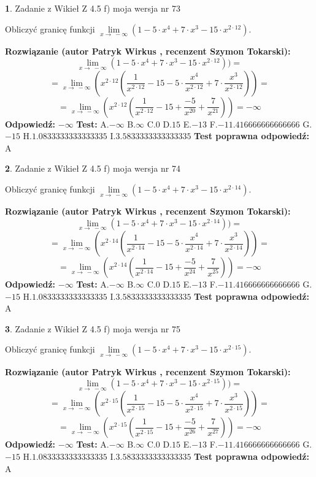 \documentclass[12pt, a4paper]{article}
\theoremstyle{definition} %
\newtheorem{zad}{}
\newcommand{\zadStart}[1]{\begin{zad}#1\newline}
\newcommand{\zadStop}{\end{zad}}
\newcommand{\rozwStart}[2]{\noindent \textbf{Rozwiązanie (autor #1 , recenzent #2): }\newline}
\newcommand{\rozwStop}{\newline}
\newcommand{\odpStart}{\noindent \textbf{Odpowiedź:}\newline}
\newcommand{\odpStop}{\newline}
\newcommand{\testStart}{\noindent \textbf{Test:}\newline}
\newcommand{\testStop}{\newline}
\newcommand{\kluczStart}{\noindent \textbf{Test poprawna odpowiedź:}\newline}
\newcommand{\kluczStop}{\newline}
\begin{document}
\zadStart{Zadanie z Wikieł Z 4.5 f) moja wersja nr 73}


Obliczyć granicę funkcji  $\lim\limits_{x\to\ -\infty}(1 - 5 \cdot x^{4}+7 \cdot x^{3}- 15 \cdot x^{2\cdot12})$.
\zadStop
\rozwStart{Patryk Wirkus}{Szymon Tokarski}
$$\lim\limits_{x\to\ -\infty}(1 - 5 \cdot x^{4}+7 \cdot x^{3}- 15 \cdot x^{2\cdot12}))=$$
$$=\lim\limits_{x\to\ -\infty}(x^{2\cdot12}(\frac{1}{x^{2\cdot12}}-15 -5 \cdot \frac{x^{4}}{x^{2\cdot12}}+7 \cdot \frac{x^{3}}{x^{2\cdot12}}))=$$
$$=\lim\limits_{x\to\ -\infty}(x^{2\cdot12}(\frac{1}{x^{2\cdot12}}-15 + \frac{-5}{x^{20}}+ \frac{7}{x^{21}}))=-\infty$$
\rozwStop
\odpStart
$-\infty$
\odpStop
\testStart
A.$-\infty$ B.$\infty$ C.$0$ D.$15$ E.$-13$
F.$-11.416666666666666$ G.$-15$
H.$1.0833333333333335$
I.$3.5833333333333335$
\testStop
\kluczStart
A
\kluczStop



\zadStart{Zadanie z Wikieł Z 4.5 f) moja wersja nr 74}


Obliczyć granicę funkcji  $\lim\limits_{x\to\ -\infty}(1 - 5 \cdot x^{4}+7 \cdot x^{3}- 15 \cdot x^{2\cdot14})$.
\zadStop
\rozwStart{Patryk Wirkus}{Szymon Tokarski}
$$\lim\limits_{x\to\ -\infty}(1 - 5 \cdot x^{4}+7 \cdot x^{3}- 15 \cdot x^{2\cdot14}))=$$
$$=\lim\limits_{x\to\ -\infty}(x^{2\cdot14}(\frac{1}{x^{2\cdot14}}-15 -5 \cdot \frac{x^{4}}{x^{2\cdot14}}+7 \cdot \frac{x^{3}}{x^{2\cdot14}}))=$$
$$=\lim\limits_{x\to\ -\infty}(x^{2\cdot14}(\frac{1}{x^{2\cdot14}}-15 + \frac{-5}{x^{24}}+ \frac{7}{x^{25}}))=-\infty$$
\rozwStop
\odpStart
$-\infty$
\odpStop
\testStart
A.$-\infty$ B.$\infty$ C.$0$ D.$15$ E.$-13$
F.$-11.416666666666666$ G.$-15$
H.$1.0833333333333335$
I.$3.5833333333333335$
\testStop
\kluczStart
A
\kluczStop



\zadStart{Zadanie z Wikieł Z 4.5 f) moja wersja nr 75}


Obliczyć granicę funkcji  $\lim\limits_{x\to\ -\infty}(1 - 5 \cdot x^{4}+7 \cdot x^{3}- 15 \cdot x^{2\cdot15})$.
\zadStop
\rozwStart{Patryk Wirkus}{Szymon Tokarski}
$$\lim\limits_{x\to\ -\infty}(1 - 5 \cdot x^{4}+7 \cdot x^{3}- 15 \cdot x^{2\cdot15}))=$$
$$=\lim\limits_{x\to\ -\infty}(x^{2\cdot15}(\frac{1}{x^{2\cdot15}}-15 -5 \cdot \frac{x^{4}}{x^{2\cdot15}}+7 \cdot \frac{x^{3}}{x^{2\cdot15}}))=$$
$$=\lim\limits_{x\to\ -\infty}(x^{2\cdot15}(\frac{1}{x^{2\cdot15}}-15 + \frac{-5}{x^{26}}+ \frac{7}{x^{27}}))=-\infty$$
\rozwStop
\odpStart
$-\infty$
\odpStop
\testStart
A.$-\infty$ B.$\infty$ C.$0$ D.$15$ E.$-13$
F.$-11.416666666666666$ G.$-15$
H.$1.0833333333333335$
I.$3.5833333333333335$
\testStop
\kluczStart
A
\kluczStop
\end{document}
